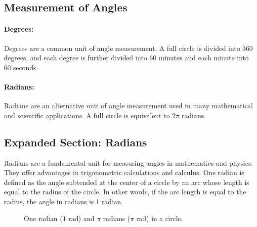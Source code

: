 \documentclass[a4paper,12pt]{book}
\begin{document}
\subsection{Measurement of Angles}

\paragraph{Degrees:} Degrees are a common unit of angle measurement. A full circle is divided into 360 degrees, and each degree is further divided into 60 minutes and each minute into 60 seconds.

\paragraph{Radians:} Radians are an alternative unit of angle measurement used in many mathematical and scientific applications. A full circle is equivalent to $2\pi$ radians.

\subsection{Expanded Section: Radians}

Radians are a fundamental unit for measuring angles in mathematics and physics. They offer advantages in trigonometric calculations and calculus. One radian is defined as the angle subtended at the center of a circle by an arc whose length is equal to the radius of the circle. In other words, if the arc length is equal to the radius, the angle in radians is 1 radian.





\begin{figure}[htbp]
    \centering
    \caption{One radian ($1$ rad) and $\pi$ radians ($\pi$ rad) in a circle.}
    \label{fig:radians_definition}
\end{figure}
\end{document}
